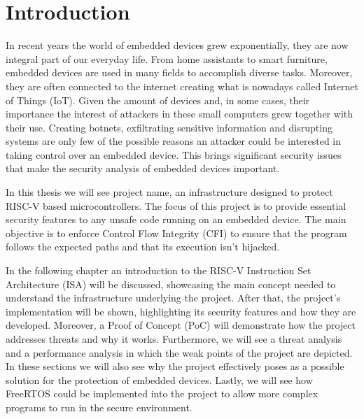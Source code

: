 \chapter{Introduction}
\label{cha:introduction}

In recent years the world of embedded devices grew exponentially, they are now integral
part of our everyday life. From home assistants to smart furniture, embedded devices
are used in many fields to accomplish diverse tasks. Moreover, they are often connected
to the internet creating what is nowadays called Internet of Things (IoT). Given
the amount of devices and, in some cases, their importance the interest of
attackers in these small computers grew together with their use. Creating botnets,
exfiltrating sensitive information and disrupting systems are only few of the
possible reasons an attacker could be interested in taking control over an
embedded device. This brings significant security issues that make the security analysis
of embedded devices important.

In this thesis we will see project name, an infrastructure designed to protect
RISC-V based microcontrollers. The focus of this project is to provide essential
security features to any unsafe code running on an embedded device. The main
objective is to enforce Control Flow Integrity (CFI) to ensure that the program
follows the expected paths and that its execution isn't hijacked.

In the following chapter an introduction to the RISC-V Instruction Set
Architecture (ISA) will be discussed, showcasing the main concept needed to understand
the infrastructure underlying the project. After that, the project's implementation
will be shown, highlighting its security features and how they are developed. Moreover,
a Proof of Concept (PoC) will demonstrate how the project addresses threats and
why it works. Furthermore, we will see a threat analysis and a performance
analysis in which the weak points of the project are depicted. In these sections
we will also see why the project effectively poses as a possible solution for the
protection of embedded devices. Lastly, we will see how FreeRTOS could be implemented
into the project to allow more complex programs to run in the secure environment.
